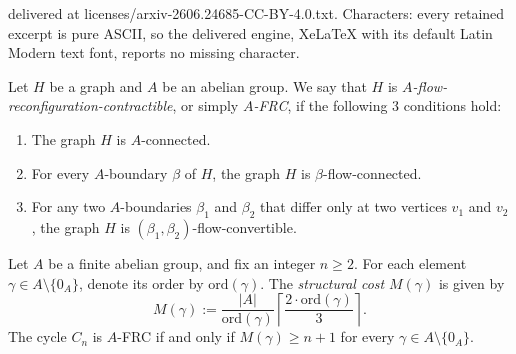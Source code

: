 \documentclass[10pt,a4paper]{amsart}
\newcommand\ord{\mbox{ord}}
\renewcommand\ge\geqslant
\renewcommand\ge\geqslant
\begin{document}
delivered at licenses/arxiv-2606.24685-CC-BY-4.0.txt. Characters: every retained excerpt is pure ASCII, so the delivered engine, XeLaTeX with its default Latin Modern text font, reports no missing character.
\begin{definition}
\label{$A$-FRC-def}
Let $H$ be a graph and $A$ be an abelian group.
We say that $H$ is \emph{$A$-flow-reconfiguration-contractible}, or simply \emph{$A$-FRC}, if the following 3 conditions hold:
\begin{enumerate}[label=(\roman*)]
\item\label{FRC-1}
The graph $H$ is $A$-connected.
\item\label{FRC-2}
For every $A$-boundary $\beta$ of $H$, the graph $H$ is $\beta$-flow-connected.
\item\label{FRC-3}
For any two $A$-boundaries $\beta_1$ and $\beta_2$ that differ only at two vertices $v_1$ and $v_2$, the graph $H$ is $(\beta_1,\beta_2)$-flow-convertible.
\end{enumerate}
\end{definition}

\begin{theorem}\label{thm:universal-FRC}
Let $A$ be a finite abelian group, 
and fix an integer $n \ge 2$. 
For each element $\gamma \in A \setminus \{0_A\}$, denote its order by $\ord(\gamma)$. The \emph{structural cost} $M(\gamma)$ is given by 
\[ M(\gamma):= \frac{|A|}{\ord(\gamma)} \left\lceil \frac{2 \cdot \ord(\gamma)}{3} \right\rceil. \]
The cycle $C_n$ is $A$-FRC if and only if $M(\gamma) \ge n + 1$ for every $\gamma \in A \setminus \{0_A\}$.
\end{theorem}
\end{document}
